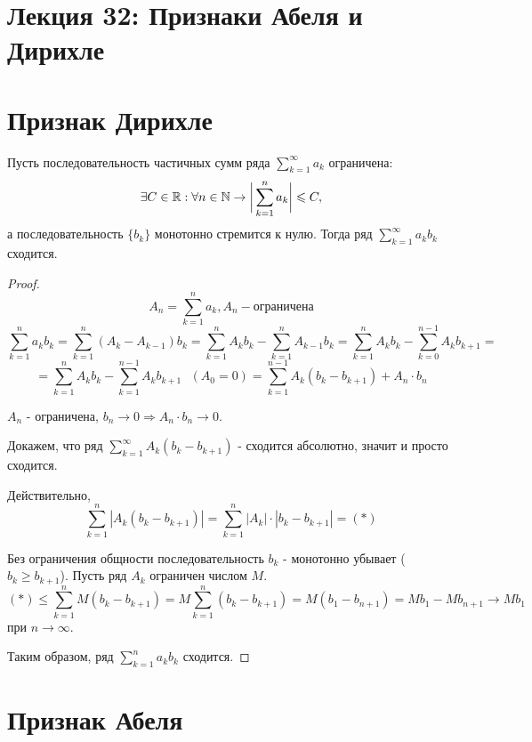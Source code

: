 	\section*{Лекция 32: Признаки Абеля и Дирихле}
	
	\section{Признак Дирихле}
	
	\begin{theorem}
		Пусть последовательность частичных сумм ряда $\displaystyle \sum_{k = 1}^{\infty} {a_k}$ ограничена:
		\[ \exists C \in \mathbb R: \forall n \in \mathbb N \rightarrow \bigg|\sum_{k = 1}^n {a_k}\bigg| \leqslant C, \]
		а последовательность $\{b_k\}$ монотонно стремится к нулю. Тогда ряд $\displaystyle \sum_{k = 1}^{\infty} a_k b_k$ сходится.
	\end{theorem}
	
	\begin{proof}
		\[ A_n = \sum_{k = 1}^n a_k, A_n - \text{ограничена}\]
		\[ \sum_{k = 1}^n a_k b_k = \sum_{k = 1}^n (A_k - A_{k - 1})b_k = \sum_{k = 1}^n A_k b_k - \sum_{k = 1}^n A_{k - 1} b_k = \sum_{k = 1}^n A_k b_k - \sum_{k = 0}^{n - 1} A_k b_{k + 1} = \]
		\[ = \sum_{k = 1}^n A_k b_k - \sum_{k = 1}^{n - 1} A_k b_{k + 1} \text{ } (A_0 = 0) = \sum_{k = 1}^{n - 1} A_k(b_k - b_{k + 1}) + A_n \cdot b_n \]
		
		$A_n$ - ограничена, $b_n \to 0 \Rightarrow A_n \cdot b_n \to 0$.
		
		Докажем, что ряд $\sum_{k = 1}^{\infty} A_k (b_k - b_{k + 1})$ - сходится абсолютно, значит и просто сходится.
		
		Действительно,
		\[ \sum_{k = 1}^n |A_k (b_k - b_{k + 1})| = \sum_{k = 1}^n |A_k| \cdot |b_k - b_{k + 1}| = (*) \]
		
		Без ограничения общности последовательность ${b_k}$ - монотонно убывает ($b_k \geqslant b_{k + 1}$). Пусть ряд $A_k$ ограничен числом $M$.
		\[ (*) \leqslant \sum_{k = 1}^n M (b_k - b_{k + 1}) = M \sum_{k = 1}^n (b_k - b_{k + 1}) = M (b_1 - b_{n + 1}) = M b_1 - M b_{n + 1} \to M b_1 \]
	    при $n \to \infty$.
	    
	    Таким образом, ряд $\sum_{k = 1}^n a_k b_k$ сходится.
	\end{proof}
	
	\section{Признак Абеля}
	
